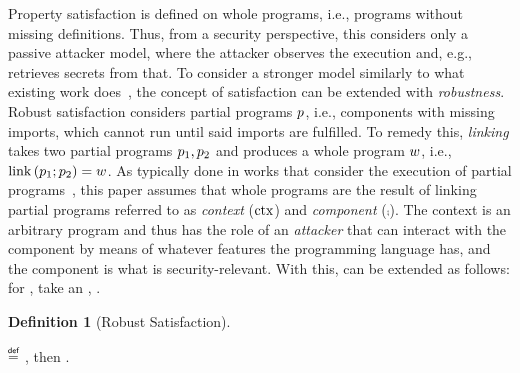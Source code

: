 \documentclass[dvipsnames,conference]{IEEEtran}
\theoremstyle{definition}
\newtheorem{definition}{Definition}[section]
\begin{document}
Property satisfaction is defined on whole programs, i.e., programs without missing definitions.
Thus, from a security perspective, this considers only a passive attacker model, where the attacker observes the execution and, e.g., retrieves secrets from that.
To consider a stronger model similarly to what existing work does~\cite{abate2019jour,abate2021extacc,maffeis2008code-carrying,gordon2003authenticity,fournet2007authorization,bengtson2011refine,backes2014uniontyps,michael2023mswasm,swasey2017robust,sammler2019benefits}, the concept of satisfaction can be extended with {\em robustness}.
Robust satisfaction considers partial programs $\progvar$, i.e., components with missing imports, which cannot run until said imports are fulfilled.
To remedy this, {\em linking} takes two partial programs $\progvar[_{1}],\progvar[_{2}]$ and produces a whole program $\wholeprogvar$, i.e., $\link{\progvar[_{1}]}{\progvar[_{2}]}=\wholeprogvar$.
As typically done in works that consider the execution of partial programs~\cite{abate2019jour,devriese2018parametricity,patrignani2021rsc,korashy2021capableptrs,strydonck2019lincap,devriese2017modular,bowman2015noninterference,ahmed2011equivcps,patterson2017linkingtyps},
this paper assumes that whole programs are the result of linking partial programs referred to as {\em context} ($\ctx$) and {\em component} ($\comp$).
The context is an arbitrary program and thus has the role of an {\em attacker} that can interact with the component by means of whatever features the programming language has, and the component is what is security-relevant.
With this,  can be extended as follows: for , take an , .

\begin{definition}[Robust Satisfaction]\label{def:proprsat}
  $\;$\\
  \vspace{-1em}
  \begin{nscenter}
  \bul{$\rsat{\progvar}{\pi}$}
  $\isdef$ , then \oul{$\sat{\wholeprogvar}{\pi}$}.
  \end{nscenter}
\end{definition}
\end{document}
